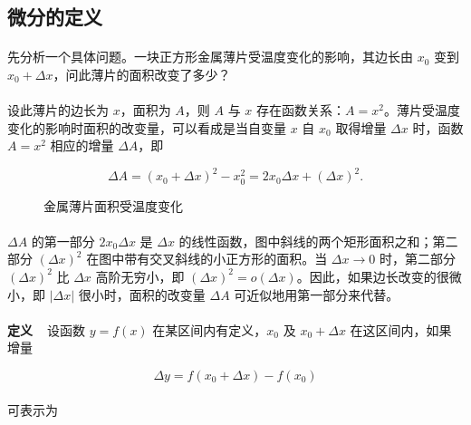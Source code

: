 \subsection{微分的定义}
\paragraph{}
先分析一个具体问题。一块正方形金属薄片受温度变化的影响，其边长由 $x_0$ 变到 $x_0 + \Delta x$，问此薄片的面积改变了多少？

\paragraph{}
设此薄片的边长为 $x$，面积为 $A$，则 $A$ 与 $x$ 存在函数关系：$A = x^2$。薄片受温度变化的影响时面积的改变量，可以看成是当自变量 $x$ 自 $x_0$ 取得增量 $\Delta x$ 时，函数 $A = x^2$ 相应的增量 $\Delta A$，即

\begin{equation}
\Delta A = (x_0 + \Delta x)^2 - x_0^2 = 2x_0\Delta x + (\Delta x)^2.
\end{equation}

\begin{figure}[H]
  \centering
    
    \caption{金属薄片面积受温度变化}
    \label{金属薄片面积受温度变化}
\end{figure}

\paragraph{}
$\Delta A$ 的第一部分 $2x_0\Delta x$ 是 $\Delta x$ 的线性函数，图中斜线的两个矩形面积之和；第二部分 $(\Delta x)^2$ 在图中带有交叉斜线的小正方形的面积。当 $\Delta x \to 0$ 时，第二部分 $(\Delta x)^2$ 比 $\Delta x$ 高阶无穷小，即 $(\Delta x)^2 = o(\Delta x)$。因此，如果边长改变的很微小，即 $|\Delta x|$ 很小时，面积的改变量 $\Delta A$ 可近似地用第一部分来代替。

\paragraph{}
\textbf{定义~~}设函数 $y = f(x)$ 在某区间内有定义，$x_0$ 及 $x_0 + \Delta x$ 在这区间内，如果增量

\begin{equation}
\Delta y = f(x_0 + \Delta x) - f(x_0)
\end{equation}

\paragraph{}
可表示为

